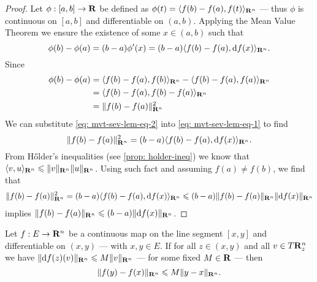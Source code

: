 \begin{proof}
    Let \(\phi: [a, b] \to \mathbf{R}\) be defined as \(\phi(t) = \langle f(b) - f(a), f(t) \rangle_{\mathbf{R}^n}\) ---
    thus \(\phi\) is continuous on \([a, b]\) and differentiable on \((a, b)\).
    Applying the Mean Value Theorem we ensure the existence of some \(x \in (a, b)\)
    such that
    \begin{equation}
        \label{eq: mvt-sev-lem-eq-1}
        \phi(b) - \phi(a) = (b - a) \phi'(x)
        = (b - a) \langle f(b) - f(a), \mathrm{d} f(x) \rangle_{\mathbf{R}^n}.
    \end{equation}
    Since
    \begin{align}
        \nonumber
        \phi(b) - \phi(a)
         & = \langle f(b) - f(a), f(b) \rangle_{\mathbf{R}^n} - \langle f(b) - f(a), f(a)
        \rangle_{\mathbf{R}^n}                                                            \\
        \nonumber
         & = \langle f(b) - f(a), f(b) - f(a) \rangle_{\mathbf{R}^n}                      \\
        \label{eq: mvt-sev-lem-eq-2}
         & = \lVert f(b) - f(a)\rVert_{\mathbf{R}^n}^2
    \end{align}
    We can substitute \cref{eq: mvt-sev-lem-eq-2} into \cref{eq: mvt-sev-lem-eq-1}
    to find
    \[
        \lVert f(b) - f(a)\rVert_{\mathbf{R}^n}^2 = (b - a) \langle f(b) - f(a), \mathrm{d} f(x)
        \rangle_{\mathbf{R}^n}.
    \]
    From H\H{o}lder's inequalities (see \cref{prop: holder-ineq}) we know that
    \(\langle v, u \rangle_{\mathbf{R}^n} \leqslant \lVert v\rVert_{\mathbf{R}^n} \lVert u\rVert_{\mathbf{R}^n}\). Using
    such fact and assuming \(f(a) \neq f(b)\), we find that
    \begin{align*}
        \lVert f(b) - f(a)\rVert_{\mathbf{R}^n}^2
        = (b - a) \langle f(b) - f(a), \mathrm{d} f(x) \rangle_{\mathbf{R}^n}
        \leqslant (b - a) \lVert f(b) - f(a)\rVert_{\mathbf{R}^n} \lVert\mathrm{d} f(x)\rVert_{\mathbf{R}^n}
    \end{align*}
    implies \(\lVert f(b) - f(a)\rVert_{\mathbf{R}^n} \leqslant (b - a) \lVert\mathrm{d} f(x)\rVert_{\mathbf{R}^n}\).
\end{proof}

\begin{theorem}
    \label{thm: several-mvt-Rn-val}
    Let \(f: E \to \mathbf{R}^n\) be a continuous map on the line segment \([x, y]\) and
    differentiable on \((x, y)\) --- with \(x, y \in E\). If for all \(z \in (x,
    y)\) and all \(v \in T\mathbf{R}^n_z\) we have \(\lVert\mathrm{d} f(z)(v)\rVert_{\mathbf{R}^n} \leqslant M
    \lVert v\rVert_{\mathbf{R}^n}\) --- for some fixed \(M \in \mathbf{R}\) --- then
    \[
        \lVert f(y) - f(x)\rVert_{\mathbf{R}^n} \leqslant M \lVert y - x\rVert_{\mathbf{R}^n}.
    \]
\end{theorem}

